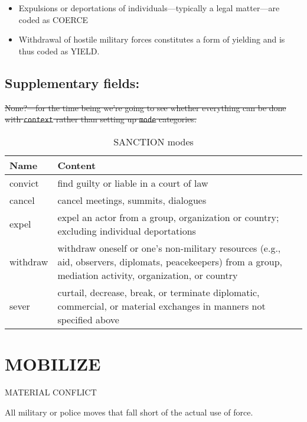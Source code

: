 \documentclass[11pt]{report}
\newcommand{\plcat}[1]{\textsf{#1}}
\begin{document}
\begin{itemize}
\item Expulsions or deportations of individuals---typically a legal matter---are coded as \plcat{COERCE} 
\item Withdrawal of hostile military forces constitutes a form of yielding and is thus coded as \plcat{YIELD}.
\end{itemize}

\subsection{Supplementary fields:}

\sout{None?---for the time being we're going to see whether everything can be done with \texttt{context} rather than setting up \texttt{mode} categories.}

\begin{table}[htp]
\color{red}
\caption{SANCTION modes}
\begin{center}
\begin{tabular}{|l|p{13cm}|}
\hline
Name & Content \\
\hline
convict & find guilty or liable in a court of law\\
cancel & cancel meetings, summits, dialogues  \\
expel & expel an actor from a group, organization or country; excluding individual deportations \\
withdraw & withdraw oneself or one's non-military resources (e.g., aid, observers, diplomats, peacekeepers) from a group, mediation activity, organization, or country\\
sever & curtail, decrease, break, or terminate diplomatic, commercial, or material exchanges in manners not specified above \\
\hline
\end{tabular}
\end{center}
\label{tab:sanctionmode}
\end{table}%


\newpage  

\section{MOBILIZE}

\textsf{MATERIAL CONFLICT} \vspace{8pt}


All military or police moves that fall short of the actual use of force. 
\end{document}
